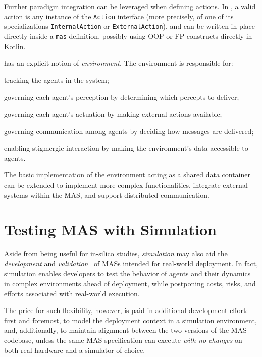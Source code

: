 Further paradigm integration can be leveraged when defining actions.
%
In \jakta{}, a valid action is any instance of the \texttt{Action} interface
(more precisely, of one of its specializations \texttt{InternalAction} or \texttt{ExternalAction}),
and can be written in-place directly inside a \texttt{mas} definition,
possibly using \ac{OOP} or \ac{FP} constructs directly in Kotlin.

\jakta{} has an explicit notion of \emph{environment}. The \jakta{} environment is responsible for:
%
\begin{inlinelist}
    \item tracking the agents in the system;
    \item governing each agent's perception by determining which percepts to deliver;
    \item governing each agent's actuation by making external actions available;
    \item governing communication among agents by deciding how messages are delivered;
    \item enabling stigmergic interaction by making the environment's data accessible to agents.
\end{inlinelist}
%
The basic implementation of the environment acting as a shared data container can be extended to implement more complex functionalities, integrate external systems within the \ac{MAS}, and support distributed communication. 


\section{Testing \acs{MAS} with Simulation}
\label{sec:mas:engineering:simulation}

Aside from being useful for in-silico studies,
\emph{simulation} may also aid the \emph{development} and \emph{validation}~\cite{uhrmacher_simulation_2002}
of \acp{MAS} intended for real-world deployment.
%
In fact, simulation enables developers to test the behavior of agents
and their dynamics in complex environments ahead of deployment,
while postponing costs, risks, and efforts associated with real-world execution.

The price for such flexibility, however,
is paid in additional development effort:
first and foremost, to model the deployment context in a simulation environment,
and, additionally,
to maintain alignment between the two versions of the \ac{MAS} codebase,
unless the same \ac{MAS} specification can execute \emph{with no changes}
on both real hardware and a simulator of choice.

